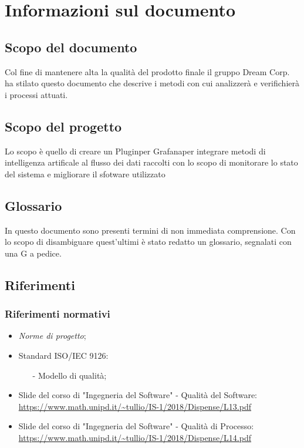 \section{Informazioni sul documento}
\subsection{Scopo del documento}
 Col fine di mantenere alta la qualità del prodotto finale il gruppo Dream Corp. ha stilato questo documento che descrive i metodi con cui analizzerà e verifichierà i processi attuati.
 \subsection{Scopo del progetto}
 Lo scopo è quello di creare un Plugin\pedice per Grafana\pedice per integrare metodi di intelligenza artificale al flusso dei dati raccolti con lo scopo di monitorare lo stato del sistema e migliorare il sfotware utilizzato
 \subsection{Glossario}
 In questo documento sono presenti termini di non immediata comprensione. Con lo scopo di disambiguare quest'ultimi è stato redatto un glossario, segnalati con una G a pedice.

 \newpage
 \subsection{Riferimenti}
 \subsubsection{Riferimenti normativi}
 \begin{itemize}
 	\item \textit{Norme di progetto};
 	\item Standard ISO/IEC 9126:
 		\begin{itemize}
 			\item[-] Modello di qualità;
 		\end{itemize}
	\item Slide del corso di "Ingegneria del Software" - Qualità del Software: \\
		\url{https://www.math.unipd.it/~tullio/IS-1/2018/Dispense/L13.pdf}
	\item  Slide del corso di "Ingegneria del Software" - Qualità di Processo: \\
		\url{https://www.math.unipd.it/~tullio/IS-1/2018/Dispense/L14.pdf}
 \end{itemize}
